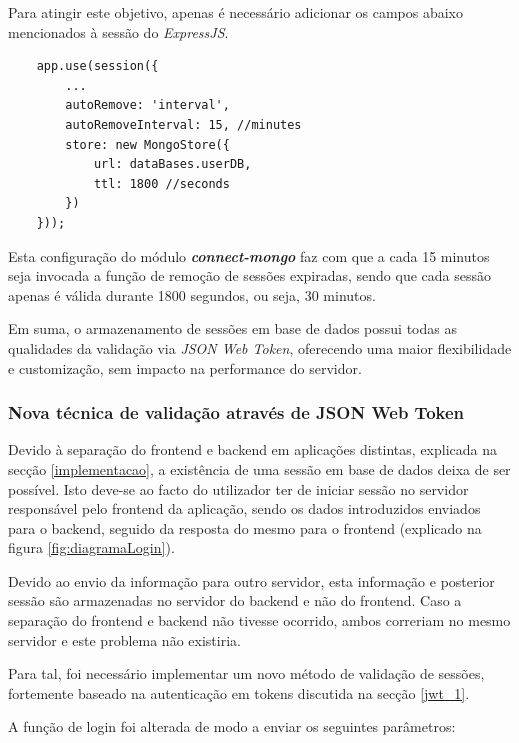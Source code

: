 Para atingir este objetivo, apenas é necessário adicionar os campos abaixo mencionados à sessão do \emph{ExpressJS}.

\begin{verbatim}
    app.use(session({
        ...
        autoRemove: 'interval',
        autoRemoveInterval: 15, //minutes
        store: new MongoStore({
            url: dataBases.userDB,
            ttl: 1800 //seconds
        })
    }));
\end{verbatim}

Esta configuração do módulo \emph{\textbf{connect-mongo}} faz com que a cada 15 minutos seja invocada a função de remoção de sessões expiradas, sendo que cada sessão apenas é válida durante 1800 segundos, ou seja, 30 minutos.

Em suma, o armazenamento de sessões em base de dados possui todas as qualidades da validação via \emph{JSON Web Token}, oferecendo uma maior flexibilidade e customização, sem impacto na performance do servidor.

\cleardoublepage
\subsubsection{Nova técnica de validação através de JSON Web Token} \label{jwt_2}

Devido à separação do frontend e backend em aplicações distintas, explicada na secção \ref{implementacao}, a existência de uma sessão em base de dados deixa de ser possível. Isto deve-se ao facto do utilizador ter de iniciar sessão no servidor responsável pelo frontend da aplicação, sendo os dados introduzidos enviados para o backend, seguido da resposta do mesmo para o frontend (explicado na figura \ref{fig:diagramaLogin}).

Devido ao envio da informação para outro servidor, esta informação e posterior sessão são armazenadas no servidor do backend e não do frontend. Caso a separação do frontend e backend não tivesse ocorrido, ambos correriam no mesmo servidor e este problema não existiria.

Para tal, foi necessário implementar um novo método de validação de sessões, fortemente baseado na autenticação em tokens discutida na secção \ref{jwt_1}.

A função de login foi alterada de modo a enviar os seguintes parâmetros:

